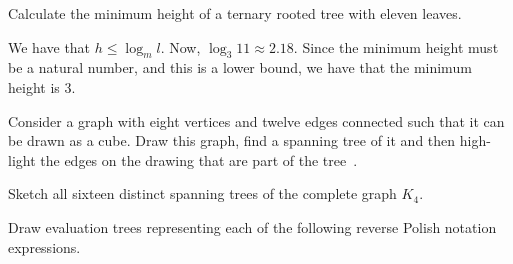 \documentclass[addpoints,12pt]{exam}
\begin{document}
\begin{questions}
\question
Calculate the minimum height of a ternary rooted tree with eleven leaves.
\begin{solution}
We have that $h \leq  \log_m l$.
Now, $\log_3 11 \approx 2.18$.
Since the minimum height must be a natural number, and this is a lower bound, we have that the minimum height is 3.
\end{solution}

\question
Consider a graph with eight vertices and twelve edges connected such that it can be drawn as a cube.
Draw this graph, find a spanning tree of it and then high-light the edges on the drawing that are part of the tree~\cite{biggs02}.

\question
Sketch all sixteen distinct spanning trees of the complete graph $K_4$.


\question
Draw evaluation trees representing each of the following reverse Polish notation expressions.


\end{questions}



\end{document}
